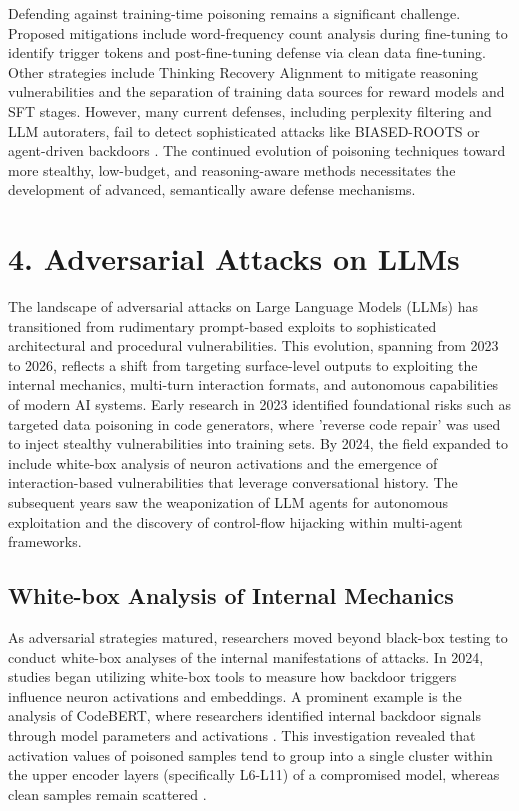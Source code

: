 \documentclass[11pt,a4paper]{article}
\begin{document}
Defending against training-time poisoning remains a significant challenge. Proposed mitigations include word-frequency count analysis during fine-tuning to identify trigger tokens and post-fine-tuning defense via clean data fine-tuning. Other strategies include Thinking Recovery Alignment to mitigate reasoning vulnerabilities \cite{Zhu_2025_Think} and the separation of training data sources for reward models and SFT stages. However, many current defenses, including perplexity filtering and LLM autoraters, fail to detect sophisticated attacks like BIASED-ROOTS or agent-driven backdoors \cite{Chaudhari_2025_Cascading, Li_2025_LLM}. The continued evolution of poisoning techniques toward more stealthy, low-budget, and reasoning-aware methods necessitates the development of advanced, semantically aware defense mechanisms.

\section{4. Adversarial Attacks on LLMs}

The landscape of adversarial attacks on Large Language Models (LLMs) has transitioned from rudimentary prompt-based exploits to sophisticated architectural and procedural vulnerabilities. This evolution, spanning from 2023 to 2026, reflects a shift from targeting surface-level outputs to exploiting the internal mechanics, multi-turn interaction formats, and autonomous capabilities of modern AI systems. Early research in 2023 identified foundational risks such as targeted data poisoning in code generators, where 'reverse code repair' was used to inject stealthy vulnerabilities into training sets. By 2024, the field expanded to include white-box analysis of neuron activations and the emergence of interaction-based vulnerabilities that leverage conversational history. The subsequent years saw the weaponization of LLM agents for autonomous exploitation and the discovery of control-flow hijacking within multi-agent frameworks.

\subsection{White-box Analysis of Internal Mechanics}

As adversarial strategies matured, researchers moved beyond black-box testing to conduct white-box analyses of the internal manifestations of attacks. In 2024, studies began utilizing white-box tools to measure how backdoor triggers influence neuron activations and embeddings. A prominent example is the analysis of CodeBERT, where researchers identified internal backdoor signals through model parameters and activations \cite{Hussain_2024_Measuring}. This investigation revealed that activation values of poisoned samples tend to group into a single cluster within the upper encoder layers (specifically L6-L11) of a compromised model, whereas clean samples remain scattered \cite{Hussain_2024_Measuring}.
\end{document}
